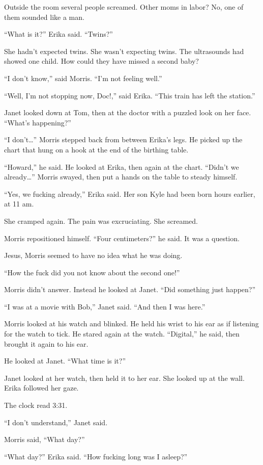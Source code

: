 Outside the room several people screamed. Other moms in labor? No, one of them sounded like a man.

“What is it?” Erika said. “Twins?”

She hadn’t expected twins. She wasn’t expecting twins. The ultrasounds had showed one child. How could they have missed a second baby?

“I don’t know,” said Morris. “I’m not feeling well.”

“Well, I’m not stopping now, Doc!,” said Erika. “This train has left the station.”

Janet looked down at Tom, then at the doctor with a puzzled look on her face. “What’s happening?”

“I don’t…” Morris stepped back from between Erika’s legs. He picked up the chart that hung on a hook at the end of the birthing table.

“Howard,” he said. He looked at Erika, then again at the chart. “Didn’t we already…” Morris swayed, then put a hands on the table to steady himself.

“Yes, we fucking already,” Erika said. Her son Kyle had been born hours earlier, at 11 am.

She cramped again. The pain was excruciating. She screamed.

Morris repositioned himself. “Four centimeters?” he said. It was a question.

Jesus, Morris seemed to have no idea what he was doing.

“How the fuck did you not know about the second one!”

Morris didn’t answer. Instead he looked at Janet. “Did something just happen?”

“I was at a movie with Bob,” Janet said. “And then I was here.”

Morris looked at his watch and blinked. He held his wrist to his ear as if listening for the watch to tick. He stared again at the watch. “Digital,” he said, then brought it again to his ear.

He looked at Janet. “What time is it?”

Janet looked at her watch, then held it to her ear. She looked up at the wall. Erika followed her gaze.

The clock read 3:31.

“I don’t understand,” Janet said.

Morris said, “What day?”

“What day?” Erika said. “How fucking long was I asleep?”

